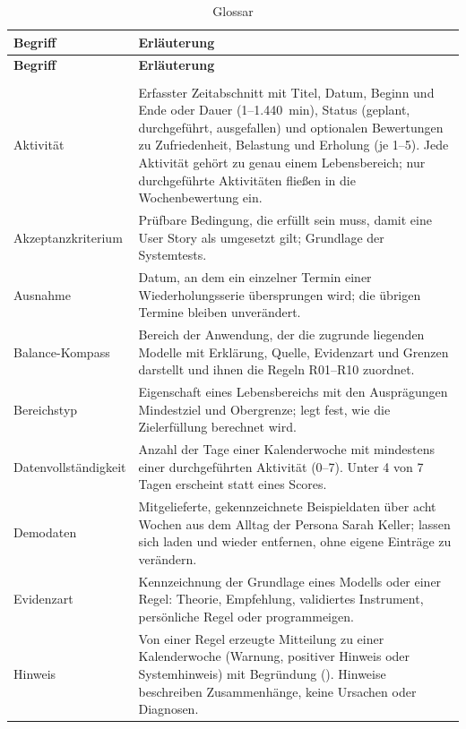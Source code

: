 \begingroup\tabsatz
\begin{longtable}{@{}L{3.4cm}L{11.8cm}@{}}
  \caption{Glossar}\label{tab:glossar}\\
  \toprule
  \textbf{Begriff} & \textbf{Erläuterung} \\
  \midrule
  \endfirsthead
  \toprule
  \textbf{Begriff} & \textbf{Erläuterung} \\
  \midrule
  \endhead
  \endfoot
  \bottomrule
   \\
  \endlastfoot
  Aktivität & Erfasster Zeitabschnitt mit Titel, Datum, Beginn und Ende oder Dauer (1--1.440~min), Status (geplant, durchgeführt, ausgefallen) und optionalen Bewertungen zu Zufriedenheit, Belastung und Erholung (je 1--5). Jede Aktivität gehört zu genau einem Lebensbereich; nur durchgeführte Aktivitäten fließen in die Wochenbewertung ein. \\
  \midrule
  Akzeptanzkriterium & Prüfbare Bedingung, die erfüllt sein muss, damit eine User Story als umgesetzt gilt; Grundlage der Systemtests. \\
  \midrule
  Ausnahme & Datum, an dem ein einzelner Termin einer Wiederholungsserie übersprungen wird; die übrigen Termine bleiben unverändert. \\
  \midrule
  Balance-Kompass & Bereich der Anwendung, der die zugrunde liegenden Modelle mit Erklärung, Quelle, Evidenzart und Grenzen darstellt und ihnen die Regeln R01--R10 zuordnet. \\
  \midrule
  Bereichstyp & Eigenschaft eines Lebensbereichs mit den Ausprägungen Mindestziel und Obergrenze; legt fest, wie die Zielerfüllung berechnet wird. \\
  \midrule
  Datenvollständigkeit & Anzahl der Tage einer Kalenderwoche mit mindestens einer durchgeführten Aktivität (0--7). Unter 4 von 7 Tagen erscheint  statt eines Scores. \\
  \midrule
  Demodaten & Mitgelieferte, gekennzeichnete Beispieldaten über acht Wochen aus dem Alltag der Persona Sarah Keller; lassen sich laden und wieder entfernen, ohne eigene Einträge zu verändern. \\
  \midrule
  Evidenzart & Kennzeichnung der Grundlage eines Modells oder einer Regel: Theorie, Empfehlung, validiertes Instrument, persönliche Regel oder programmeigen. \\
  \midrule
  Hinweis & Von einer Regel erzeugte Mitteilung zu einer Kalenderwoche (Warnung, positiver Hinweis oder Systemhinweis) mit Begründung (). Hinweise beschreiben Zusammenhänge, keine Ursachen oder Diagnosen. \\

\end{longtable}
